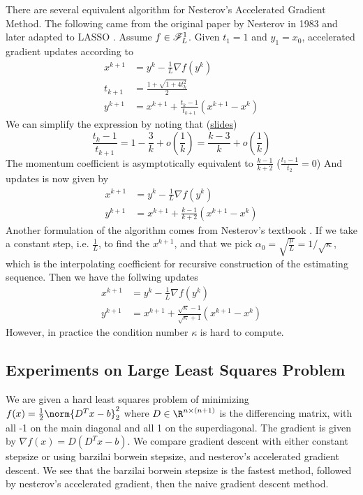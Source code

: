 \documentclass[../summary.tex]{subfiles}
\begin{document}
There are several equivalent algorithm for Nesterov's Accelerated Gradient Method. The following came from the original paper by Nesterov in 1983 \cite{nesterovMethodSolvingConvex1983} and later adapted to LASSO \cite{beckFastIterativeShrinkageThresholding2009a}. Assume $f\in \mathscr{F}_{L}^1$. Given $t_1 = 1$ and $y_1 = x_0$, accelerated gradient updates according to
\begin{align*}
    x^{k+1}
        &= y^k - \frac{1}{L} \nabla f(y^k) \\
    t_{k+1} 
        &= \frac{1 + \sqrt{1 + 4t_k^2} }{2} \\
    y^{k+1}
        &= x^{k+1} + \frac{t_k - 1}{t_{k+1}} \left( x^{k+1} - x^{k} \right)
\end{align*}
We can simplify the expression by noting that (\href{http://www.princeton.edu/~yc5/ele522_optimization/lectures/accelerated_gradient.pdf}{slides})
\[
    \frac{t_k - 1}{t_{k+1}} 
        = 1 - \frac{3}{k} + o(\frac{1}{k})
        = \frac{k-3}{k} + o(\frac{1}{k})
\]
The momentum coefficient is asymptotically equivalent to $\frac{k-1}{k+2}$ ($\frac{t_1-1}{t_{2}} = 0$)
And updates is now given by
\begin{align*}  
    x^{k+1} 
        &= y^k - \frac{1}{L} \nabla f(y^k) \\
    y^{k+1}
        &= x^{k+1} + \frac{k-1}{k+2} \left( x^{k+1} - x^k \right)
\end{align*}
Another formulation of the algorithm comes from Nesterov's textbook \cite{nesterovIntroductoryLecturesConvex2004}. If we take a constant step, i.e. $\frac{1}{L}$, to find the $x^{k+1}$, and that we pick $\alpha_0 = \sqrt{\frac{\mu}{L}} = 1/\sqrt{\kappa}$, which is the interpolating coefficient for recursive construction of the estimating sequence. Then we have the follwing updates
\begin{align*}
    x^{k+1} 
        &=  y^k - \frac{1}{L} \nabla f(y^k) \\
    y^{k+1}
        &= x^{k+1} + \frac{\sqrt{\kappa} - 1}{\sqrt{\kappa} + 1} (x^{k+1} - x^k)
\end{align*}
However, in practice the condition number $\kappa$ is hard to compute.


\subsection{Experiments on Large Least Squares Problem}

We are given a hard least squares problem of minimizing $f(x) = \frac{1}{2}\norm{D^Tx-b}_2^2$ where $D\in\R^{n\times (n+1)}$ is the differencing matrix, with all -1 on the main diagonal and all 1 on the superdiagonal. The gradient is given by $\nabla f(x) = D(D^Tx-b)$. We compare gradient descent with either constant stepsize or using barzilai borwein stepsize, and nesterov's accelerated gradient descent.
We see that the barzilai borwein stepsize is the fastest method, followed by nesterov's accelerated gradient, then the naive gradient descent method.
\end{document}
